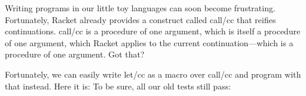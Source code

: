 
Writing programs in our little toy languages can soon become frustrating.
Fortunately, Racket already provides a construct called call/cc that reifies
continuations. call/cc is a procedure of one argument, which is itself a
procedure of one argument, which Racket applies to the current
continuation—which is a procedure of one argument. Got that?

Fortunately, we can easily write let/cc as a macro over call/cc and program with
that instead. Here it is:
To be sure, all our old tests still pass:
